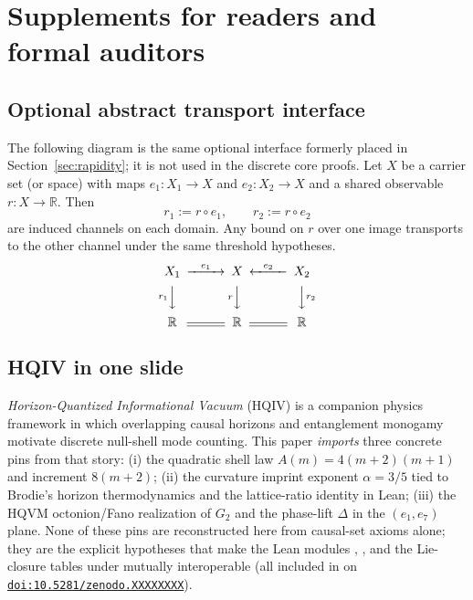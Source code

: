\documentclass[11pt]{amsart}
\newcommand{\PaperZenodoDoi}{10.5281/zenodo.XXXXXXXX}
\newcommand{\PaperArtifactBundleZip}{\path{paper_refs_bundle_2026-05-06.zip}}
\newcommand{\PaperZenodoDeposit}{\href{https://doi.org/\PaperZenodoDoi}{\texttt{doi:\PaperZenodoDoi}}}
\begin{document}
\section{Supplements for readers and formal auditors}

\subsection{Optional abstract transport interface}
\label{app:transport}
The following diagram is the same optional interface formerly placed in Section~\ref{sec:rapidity}; it is not used in the discrete core proofs. Let $X$ be a carrier set (or space) with maps $e_1:X_1\to X$ and $e_2:X_2\to X$ and a shared observable $r:X\to\mathbb R$. Then
\[
r_1:=r\circ e_1,\qquad r_2:=r\circ e_2
\]
are induced channels on each domain. Any bound on $r$ over one image transports to the other channel under the same threshold hypotheses.
\[
\begin{CD}
X_1 @>{e_1}>> X @<{e_2}<< X_2\\
@V{r_1}VV @V{r}VV @VV{r_2}V\\
\mathbb R @= \mathbb R @= \mathbb R
\end{CD}
\]

\subsection{HQIV in one slide}
\label{app:hqiv-box}
\emph{Horizon-Quantized Informational Vacuum} (HQIV) is a companion physics framework in which overlapping causal horizons and entanglement monogamy motivate discrete null-shell mode counting. This paper \emph{imports} three concrete pins from that story: (i) the quadratic shell law \(A(m)=4(m+2)(m+1)\) and increment \(8(m+2)\); (ii) the curvature imprint exponent \(\alpha=3/5\) tied to Brodie's horizon thermodynamics \cite{brodie2026} and the lattice-ratio identity in Lean; (iii) the HQVM octonion/Fano realization of \(G_2\) and the phase-lift \(\Delta\) in the \((e_1,e_7)\) plane. None of these pins are reconstructed here from causal-set axioms alone; they are the explicit hypotheses that make the Lean modules , , and the Lie-closure tables under  mutually interoperable (all included in \PaperArtifactBundleZip{} on \PaperZenodoDeposit).
\end{document}
